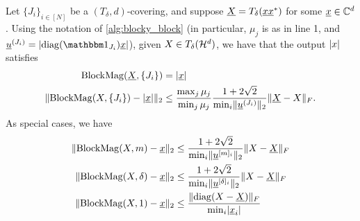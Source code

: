 \begin{proposition}
  Let $\{J_i\}_{i \in [N]}$ be a $(T_\delta, d)$-covering, and suppose $\underline{X} = T_\delta(\underline{x} \underline{x}^*)$ for some $\underline{x} \in \mathbb{C}^d$.  Using the notation of \cref{alg:blocky_block} (in particular, $\mu_j$ is as in line 1, and $\uu^{(J_i)} = \abs{\diag(\one_{J_i}) \ux}$), given $X \in T_\delta(\mathcal{H}^d)$, we have that the output $\lvert x\rvert$ satisfies
  \begin{equation}
  \begin{aligned}
    \operatorname{BlockMag}(\underline{X}, \{J_i\}) &= \lvert\underline{x}\rvert \\
    \lVert\operatorname{BlockMag}(X, \{J_i\}) - \lvert\underline{x}\rvert\rVert_2 &\le \dfrac{\max_j \mu_j}{\min_j \mu_j} \dfrac{1 + 2 \sqrt{2}}{\min_i \lVert\underline{u}^{(J_i)}\rVert_2} \lVert\underline{X} - X\rVert_F.
  \end{aligned}
  \label{eq:blocky_rec}
  \end{equation}
  As special cases, we have
  \begin{equation}
    \begin{aligned}
      \lVert\operatorname{BlockMag}(X, m) - \underline{x}\rVert_2 &\le \dfrac{1 + 2 \sqrt{2}}{\min_i \lVert\underline{u}^{[m]_i}\rVert_2} \lVert X - \underline{X}\rVert_F \\
      \lVert\operatorname{BlockMag}(X, \delta) - \underline{x}\rVert_2 &\le \dfrac{1 + 2 \sqrt{2}}{\min_i \lVert\underline{u}^{[\delta]_i}\rVert_2} \lVert X - \underline{X}\rVert_F \\
      \lVert\operatorname{BlockMag}(X, 1) - \underline{x}\rVert_2 &\le \dfrac{\lVert\operatorname{diag}(X - \underline{X})\rVert_F}{\min_i \lvert\underline{x}_i\rvert} 
    \end{aligned}
    \label{eq:blocky_spec}
  \end{equation}
  \label{prop:blocky_block}
\end{proposition}

